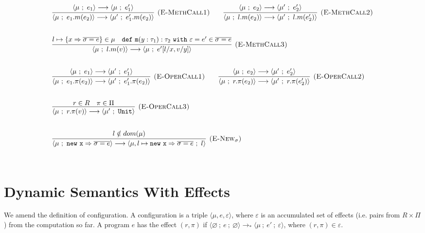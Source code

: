 \documentclass{llncs}
\newcommand{\keywadj}[1]{\mathtt{#1}}
\newcommand{\keyw}[1]{\keywadj{#1}~}
\newcommand{\config}[1] { \langle #1 \rangle }
\begin{document}
\[
\begin{array}{lll}
\begin{array}{lllr}
	\infer[\textsc{(E-MethCall1)}]
		{\config{\mu~;~e_1.m(e_2)} \longrightarrow \config{\mu'~;~e_1'.m(e_2)}}
		{\config{\mu~;~e_1} \longrightarrow \config{\mu~;~e_1'}}
		
		~~~~~~
		
	\infer[\textsc{(E-MethCall2)}]
		{\config{\mu~;~l.m(e_2)} \longrightarrow \config{\mu'~;~l.m(e_2')}}
		{\config{\mu~;~e_2} \longrightarrow \config{\mu'~;~e_2'}}\\[5ex]
		
	\infer[\textsc{(E-MethCall3)}]
		{\config{\mu~;~l.m(v)}
			\longrightarrow
		 \config{\mu~;~e'[l/x, v/y]}}
  		{l \mapsto \{ x \Rightarrow \overline{\sigma = e} \} \in \mu & \keywadj{def~m}(y: \tau_1) : \tau_2~\keyw{with} \varepsilon = e' \in \overline {\sigma = e}} \\[5ex]

			
	\infer[\textsc{(E-OperCall1)}]
		{\config{\mu~;~e_1.\pi(e_2)}
			\longrightarrow
		\config{\mu'~;~e_1'.\pi(e_2)}}
		{\config{\mu~;~e_1} \longrightarrow \config{\mu'~;~e_1'}}
~~~~~~
			\infer[\textsc{(E-OperCall2)}]
		{\config{\mu~;~r.\pi(e_2)}
			\longrightarrow
		\config{\mu'~;~r.\pi(e_2')}}
		{\config{\mu~;~e_2} \longrightarrow \config{\mu'~;~e_2'}} \\[5ex]
			
			\infer[\textsc{(E-OperCall3)}]
		{\config{\mu~;~r.\pi(v)}
			\longrightarrow
		\config{\mu'~;~\keywadj{Unit}}}
		{r \in R & \pi \in \Pi} \\[5ex]
			
	\infer[\textsc{(E-New$_\sigma$)}]
		{\config{\mu~;~\keywadj{new~x} \Rightarrow \overline{\sigma = e} }
			\longrightarrow
		 \config{\mu, l \mapsto \keywadj{new~x} \Rightarrow \overline{\sigma = e}~;~l }}
		{l \notin dom(\mu)} \\[5ex]
		
\end{array}
\end{array}
\]

\section{Dynamic Semantics With Effects}

We amend the definition of configuration. A configuration is a triple $\config{\mu, e, \varepsilon}$, where $\varepsilon$ is an accumulated set of effects (i.e. pairs from $R \times \Pi$) from the computation so far. A program $e$ has the effect $(r, \pi)$ if $\config{\varnothing~;~e~;~\varnothing} \longrightarrow_* \config{\mu~;~e'~;~\varepsilon}$, where $(r, \pi) \in \varepsilon$. 
\\
\end{document}
